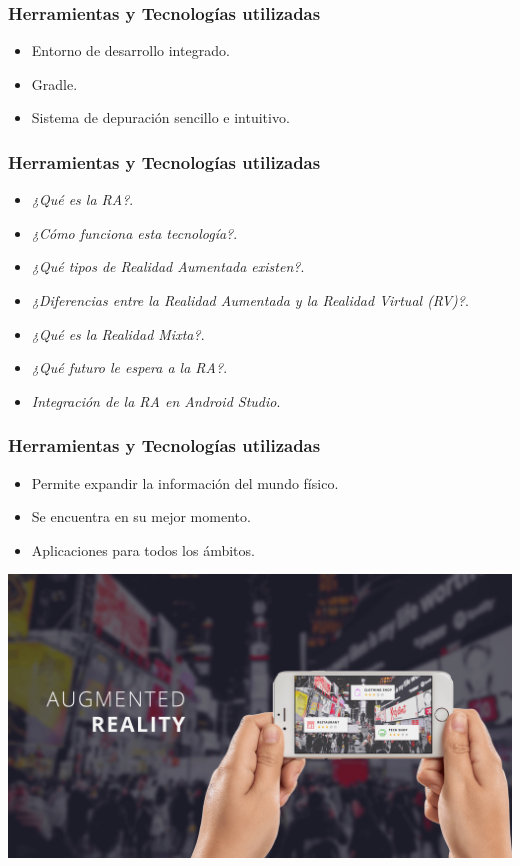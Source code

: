 \begin{frame}
	\frametitle{Herramientas y Tecnologías utilizadas}
		\begin{itemize}
			\item Entorno de desarrollo integrado.
			\item Gradle.
			\item Sistema de depuración sencillo e intuitivo.
		\end{itemize}
	\endblock{}
\end{frame}

\begin{frame}
	\frametitle{Herramientas y Tecnologías utilizadas}
		\begin{itemize}
			\item {\it ¿Qué es la RA?}.
			\item {\it ¿Cómo funciona esta tecnología?}.
			\item {\it ¿Qué tipos de Realidad Aumentada existen?}.
			\item {\it ¿Diferencias entre la Realidad Aumentada y la Realidad Virtual (RV)?}.
			\item {\it ¿Qué es la Realidad Mixta?}.
			\item {\it ¿Qué futuro le espera a la RA?}.
			\item {\it Integración de la RA en Android Studio}.
		\end{itemize}
	\endblock{}
\end{frame}


\begin{frame}
	\frametitle{Herramientas y Tecnologías utilizadas}
		\begin{itemize}
			\item Permite expandir la información del mundo físico.
			\item Se encuentra en su mejor momento.
			\item Aplicaciones para todos los ámbitos. 
		\end{itemize}
		\endblock{}

		\begin{center}
			\includegraphics[width=0.7\linewidth]{Images/ar3}
		\end{center}
	
\end{frame}

